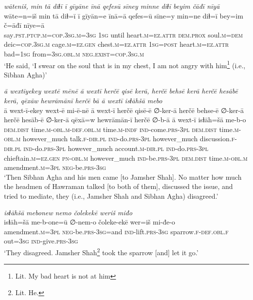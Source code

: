 \ea \label{DP.38}
\textit{wāteniš, min tā diɫī ī gīyāne īnā qefesū sīney minne diɫī beyim čāđī nīyā} \\ 
\gll wāte=n=iš min tā diɫ=ī ī gīyān=e īnā=ā qefes=ū sīne=y min=ne diɫ=ī bey=im č=āđī nīye=ā \\ 
 say\textsc{.pst}\textsc{.ptcp}\textsc{.m}\textsc{=cop}\textsc{.3sg}\textsc{.m}\textsc{=3sg} \textsc{1sg} until heart\textsc{.m}\textsc{=ez}.\textsc{attr} \textsc{dem.prox} soul\textsc{.m}\textsc{=dem} deic\textsc{=cop}\textsc{.3sg}\textsc{.m} cage\textsc{.m}\textsc{=ez}\textsc{.gen} chest\textsc{.m}\textsc{=ez}.\textsc{attr} \textsc{1sg}\textsc{=\textsc{post}} heart\textsc{.m}\textsc{=ez}.\textsc{attr} bad\textsc{=1sg} from\textsc{=3sg}\textsc{.obl}\textsc{.m} \textsc{\textsc{neg.}exist}\textsc{=cop}\textsc{.3sg}\textsc{.m} \\ 
\glt `He said, ‘I swear on the soul that is in my chest, I am not angry with him\footnote{Lit. My bad heart is not at him} (i.e., Sibhan Agha)'
\z 
 
\ea \label{DP.46}
\textit{ā wextīyekey wextē mēnē ā wextī herčē qisē kerā, herčē behsē kerā herčē hesābē kerā, qēxāw hewrāmānī herčē bā ā wextī isɫāhšā mebo} \\ 
\gll ā wext-ī-ekey wext-ē mi-ē-nē ā wext-ī herčē qisē-ē ∅-ker-ā herčē behse-ē ∅-ker-ā herčē hesāb-ē ∅-ker-ā qēxā=w hewrāmān-ī herčē ∅-b-ā ā wext-ī isɫāh=šā me-b-o \\ 
 \textsc{dem.dist} time\textsc{.m}\textsc{-obl}\textsc{.m}\textsc{-def}\textsc{.obl}\textsc{.m} time\textsc{.m}\textsc{-indf} \textsc{ind-}come\textsc{.prs}\textsc{-3pl} \textsc{dem.dist} time\textsc{.m}\textsc{-obl}\textsc{.m} however\_much talk\textsc{\textsc{.f}}\textsc{-dir}\textsc{.pl} \textsc{ind-}do\textsc{.prs}\textsc{-3pl} however\_much discussion\textsc{\textsc{.f}}\textsc{-dir}\textsc{.pl} \textsc{ind-}do\textsc{.prs}\textsc{-3pl} however\_much account\textsc{.m}\textsc{-dir}\textsc{.pl} \textsc{ind-}do\textsc{.prs}\textsc{-3pl} chieftain\textsc{.m}\textsc{=ez}\textsc{.gen} \textsc{pn}\textsc{-obl}\textsc{.m} however\_much \textsc{ind-}be\textsc{.prs}\textsc{-3pl} \textsc{dem.dist} time\textsc{.m}\textsc{-obl}\textsc{.m} amendment\textsc{.m}\textsc{=3pl} \textsc{neg-}be\textsc{.prs}\textsc{-3sg} \\ 
\glt `Then Sibhan Agha and his men came [to Jamsher Shah]. No matter how much the headmen of Hawraman talked [to both of them], discussed the issue, and tried to mediate, they (i.e., Jamsher Shah and Sibhan Agha) disagreed.'
\z 
 
\ea \label{DP.47}
\textit{isɫāhšā mebonew nemo čolekekē weriš miđo} \\ 
\gll isɫāh=šā me-b-one=ū ∅-nem-o čoleke-ekē wer=iš mi-đe-o \\ 
 amendment\textsc{.m}\textsc{=3pl} \textsc{neg-}be\textsc{.prs}\textsc{-3sg}=and \textsc{ind-}lift\textsc{.prs}\textsc{-3sg} sparrow\textsc{\textsc{.f}}\textsc{-def}\textsc{.obl}\textsc{\textsc{.f}} out\textsc{=3sg} \textsc{ind-}give\textsc{.prs}\textsc{-3sg} \\ 
\glt `They disagreed. Jamsher Shah\footnote{Lit. He.} took the sparrow [and] let it go.'
\z 
 
